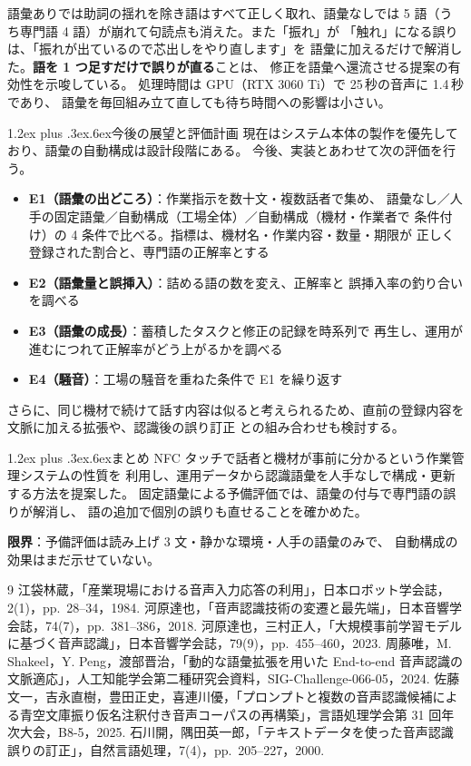 \documentclass[a4paper,10pt,twocolumn]{ltjsarticle}
\makeatletter
\renewcommand{\section}{\@startsection{section}{1}{\z@}%
  {1.2ex plus .3ex}{.6ex}{\normalfont\normalsize\bfseries\sffamily}}
\makeatother
\begin{document}
語彙ありでは助詞の揺れを除き語はすべて正しく取れ、語彙なしでは
5 語（うち専門語 4 語）が崩れて句読点も消えた。また「振れ」が
「触れ」になる誤りは、「振れが出ているので芯出しをやり直します」を
語彙に加えるだけで解消した。\textbf{語を 1 つ足すだけで誤りが直る}ことは、
修正を語彙へ還流させる提案の有効性を示唆している。
処理時間は GPU（RTX 3060 Ti）で 25\,秒の音声に 1.4\,秒であり、
語彙を毎回組み立て直しても待ち時間への影響は小さい。

\section{今後の展望と評価計画}
現在はシステム本体の製作を優先しており、語彙の自動構成は設計段階にある。
今後、実装とあわせて次の評価を行う。
\begin{itemize}
\item \textbf{E1（語彙の出どころ）}：作業指示を数十文・複数話者で集め、
  語彙なし／人手の固定語彙／自動構成（工場全体）／自動構成（機材・作業者で
  条件付け）の 4 条件で比べる。指標は、機材名・作業内容・数量・期限が
  正しく登録された割合と、専門語の正解率とする
\item \textbf{E2（語彙量と誤挿入）}：詰める語の数を変え、正解率と
  誤挿入率の釣り合いを調べる
\item \textbf{E3（語彙の成長）}：蓄積したタスクと修正の記録を時系列で
  再生し、運用が進むにつれて正解率がどう上がるかを調べる
\item \textbf{E4（騒音）}：工場の騒音を重ねた条件で E1 を繰り返す
\end{itemize}
さらに、同じ機材で続けて話す内容は似ると考えられるため、直前の登録内容を
文脈に加える拡張や、認識後の誤り訂正 \cite{ishikawa} との組み合わせも検討する。

\section{まとめ}
NFC タッチで話者と機材が事前に分かるという作業管理システムの性質を
利用し、運用データから認識語彙を人手なしで構成・更新する方法を提案した。
固定語彙による予備評価では、語彙の付与で専門語の誤りが解消し、
語の追加で個別の誤りも直せることを確かめた。

\textbf{限界}：予備評価は読み上げ 3 文・静かな環境・人手の語彙のみで、
自動構成の効果はまだ示せていない。

\begin{thebibliography}{9}\small
\setlength{\itemsep}{0pt}
 江袋林蔵，「産業現場における音声入力応答の利用」，日本ロボット学会誌，2(1)，pp.~28--34，1984.
 河原達也，「音声認識技術の変遷と最先端」，日本音響学会誌，74(7)，pp.~381--386，2018.
 河原達也，三村正人，「大規模事前学習モデルに基づく音声認識」，日本音響学会誌，79(9)，pp.~455--460，2023.
 周藤唯，M. Shakeel，Y. Peng，渡部晋治，「動的な語彙拡張を用いた End-to-end 音声認識の文脈適応」，人工知能学会第二種研究会資料，SIG-Challenge-066-05，2024.
 佐藤文一，吉永直樹，豊田正史，喜連川優，「プロンプトと複数の音声認識候補による青空文庫振り仮名注釈付き音声コーパスの再構築」，言語処理学会第 31 回年次大会，B8-5，2025.
 石川開，隅田英一郎，「テキストデータを使った音声認識誤りの訂正」，自然言語処理，7(4)，pp.~205--227，2000.
\end{thebibliography}
\end{document}
